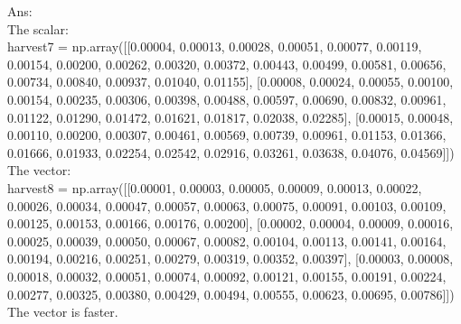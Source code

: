 \documentclass{article}
\begin{document}
Ans:%
~\\The scalar:\\
harvest7 = np.array([[0.00004, 0.00013, 0.00028, 0.00051, 0.00077, 0.00119, 0.00154, 0.00200, 0.00262, 0.00320, 0.00372, 0.00443, 0.00499, 0.00581, 0.00656, 0.00734, 0.00840, 0.00937, 0.01040, 0.01155],
[0.00008, 0.00024, 0.00055, 0.00100, 0.00154, 0.00235, 0.00306, 0.00398, 0.00488, 0.00597, 0.00690, 0.00832, 0.00961, 0.01122, 0.01290, 0.01472, 0.01621, 0.01817, 0.02038, 0.02285],
[0.00015, 0.00048, 0.00110, 0.00200, 0.00307, 0.00461, 0.00569, 0.00739, 0.00961, 0.01153, 0.01366, 0.01666, 0.01933, 0.02254, 0.02542, 0.02916, 0.03261, 0.03638, 0.04076, 0.04569]])
\\The vector:\\
harvest8 = np.array([[0.00001, 0.00003, 0.00005, 0.00009, 0.00013, 0.00022, 0.00026, 0.00034, 0.00047, 0.00057, 0.00063, 0.00075, 0.00091, 0.00103, 0.00109, 0.00125, 0.00153, 0.00166, 0.00176, 0.00200], 
[0.00002, 0.00004, 0.00009, 0.00016, 0.00025, 0.00039, 0.00050, 0.00067, 0.00082, 0.00104, 0.00113, 0.00141, 0.00164, 0.00194, 0.00216, 0.00251, 0.00279, 0.00319, 0.00352, 0.00397], 
[0.00003, 0.00008, 0.00018, 0.00032, 0.00051, 0.00074, 0.00092, 0.00121, 0.00155, 0.00191, 0.00224, 0.00277, 0.00325, 0.00380, 0.00429, 0.00494, 0.00555, 0.00623, 0.00695, 0.00786]]) 
\\The vector is faster.

\end{document}
